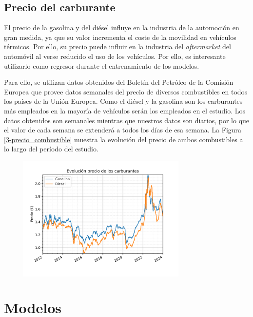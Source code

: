 \subsection{Precio del carburante}

El precio de la gasolina y del diésel influye en la industria de la automoción en gran medida, ya que su valor incrementa el coste de la movilidad en vehículos térmicos. Por ello, su precio puede influir en la industria del \textit{aftermarket} del automóvil al verse reducido el uso de los vehículos. Por ello, es interesante utilizarlo como regresor durante el entrenamiento de los modelos.

Para ello, se utilizan datos obtenidos del Boletín del Petróleo de la Comisión Europea \cite{petrol} que provee datos semanales del precio de diversos combustibles en todos los países de la Unión Europea. Como el diésel y la gasolina son los carburantes más empleados en la mayoría de vehículos serán los empleados en el estudio. Los datos obtenidos son semanales mientras que nuestros datos son diarios, por lo que el valor de cada semana se extenderá a todos los días de esa semana. La Figura \ref*{3-precio_combustible} muestra la evolución del precio de ambos combustibles a lo largo del período del estudio.

\begin{figure}[H]
	{\includegraphics[width=0.75\textwidth]{imagenes/grafica_carburantes.pdf}}
\end{figure}

\section{Modelos}

